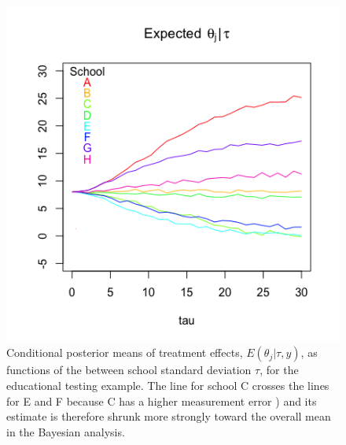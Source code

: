 \documentclass[a4paper, 9pt]{article}
\begin{document}
\begin{figure}[h!]
    \centering
    \includegraphics[scale = 0.5]{DSSchool.png}
    \caption{Conditional posterior means of treatment effects, $E(\theta_j |\tau, y)$, as functions of the between  school standard deviation $\tau$, for the educational testing example. The line for school C crosses the lines for E and F because C has a higher measurement error ) and its estimate is therefore shrunk more strongly toward the overall mean in the Bayesian analysis.}
    \label{LinesDS}
\end{figure}
\clearpage
\end{document}
